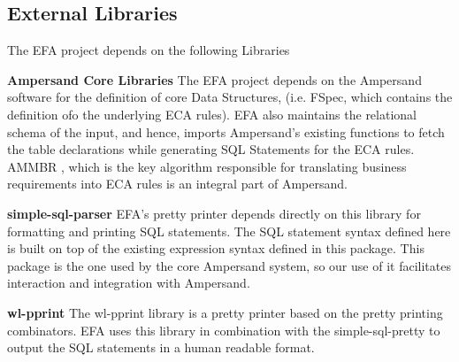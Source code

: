 \documentclass[12pt, svgnames]{article}
\let\Oldsubsection\subsection
\renewcommand{\subsection}{\FloatBarrier\Oldsubsection}
\begin{document}

        
\subsection{External Libraries}
The EFA project depends on the following Libraries 
\begin{description}
	\item \textbf{Ampersand Core Libraries} \newline
		The EFA project depends on the Ampersand software for the definition of 
		core Data Structures, (i.e. FSpec, which contains the definition ofo 
		the underlying ECA rules). EFA also maintains the relational schema of 
		the input, and hence, imports Ampersand's existing functions to fetch 
		the table declarations while generating SQL Statements for the ECA 
		rules. AMMBR \cite{AMMBR}, which is the key algorithm responsible for 
		translating business requirements into ECA rules is an integral part of 
		Ampersand.
	\item \textbf{simple-sql-parser} \newline
		EFA's pretty printer depends directly on this library for formatting 
		and printing SQL statements. The SQL statement syntax 
                defined here is built on top of the existing expression syntax defined 
                in this package. This package is the one used by the core Ampersand system,
                so our use of it facilitates interaction and integration with Ampersand. \cite{simple-sql}
	\item \textbf{wl-pprint} \newline 
          The wl-pprint library\cite{wl-pprint} is a pretty printer based on the
          pretty printing combinators. EFA uses this library in combination with
          the simple-sql-pretty to output the SQL statements in a human readable
          format.
	\item 
\end{description}
\end{document}
